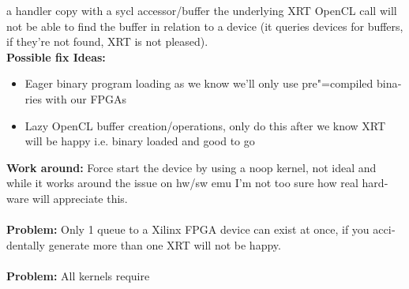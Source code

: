 \begin{otherlanguage}{english}
                                         a handler copy with a sycl
                                         accessor/buffer the underlying XRT
                                         OpenCL call will not be able to find
                                         the buffer in relation to a device (it
                                         queries devices for buffers, if they're
                                         not found, XRT is not pleased).
                                         \\
                                         \textbf{Possible fix Ideas:}
                                         \begin{itemize}
                                             \item Eager binary program loading
                                                   as we know we'll only use
                                                   pre"=compiled binaries with
                                                   our FPGAs
                                             \item Lazy OpenCL buffer
                                                   creation/operations, only do
                                                   this after we know XRT will
                                                   be happy i.e. binary loaded
                                                   and good to go
                                         \end{itemize}
                                         \textbf{Work around:} Force start the
                                         device by using a noop kernel, not
                                         ideal and while it works around the
                                         issue on hw/sw emu I'm not too sure how
                                         real hardware will appreciate this.
                                         \\
                                         \\
                                         \textbf{Problem:} Only 1 queue to a
                                         Xilinx FPGA device can exist at once,
                                         if you accidentally generate more than
                                         one XRT will not be happy.
                                         \\
                                         \\
                                         \textbf{Problem:} All kernels require

\end{otherlanguage}
